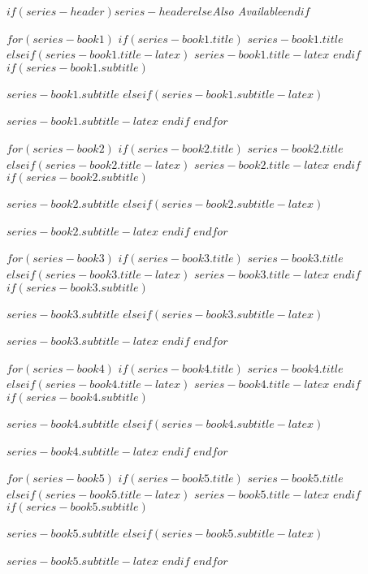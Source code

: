 \pagestyle{empty}

\begin{center}

\textit{$if(series-header)$$series-header$$else$Also Available$endif$}

\vspace{1cm}

$for(series-book1)$
$if(series-book1.title)$
\textbf{\textsc{$series-book1.title$}}
$elseif(series-book1.title-latex)$
\textbf{\textsc{$series-book1.title-latex$}}
$endif$
$if(series-book1.subtitle)$
\par $series-book1.subtitle$
$elseif(series-book1.subtitle-latex)$
\par $series-book1.subtitle-latex$
$endif$
$endfor$

\vspace{1cm}

$for(series-book2)$
$if(series-book2.title)$
\textbf{\textsc{$series-book2.title$}}
$elseif(series-book2.title-latex)$
\textbf{\textsc{$series-book2.title-latex$}}
$endif$
$if(series-book2.subtitle)$
\par $series-book2.subtitle$
$elseif(series-book2.subtitle-latex)$
\par $series-book2.subtitle-latex$
$endif$
$endfor$

$for(series-book3)$
$if(series-book3.title)$
\textbf{\textsc{$series-book3.title$}}
$elseif(series-book3.title-latex)$
\textbf{\textsc{$series-book3.title-latex$}}
$endif$
$if(series-book3.subtitle)$
\par $series-book3.subtitle$
$elseif(series-book3.subtitle-latex)$
\par $series-book3.subtitle-latex$
$endif$
$endfor$

$for(series-book4)$
$if(series-book4.title)$
\textbf{\textsc{$series-book4.title$}}
$elseif(series-book4.title-latex)$
\textbf{\textsc{$series-book4.title-latex$}}
$endif$
$if(series-book4.subtitle)$
\par $series-book4.subtitle$
$elseif(series-book4.subtitle-latex)$
\par $series-book4.subtitle-latex$
$endif$
$endfor$

$for(series-book5)$
$if(series-book5.title)$
\textbf{\textsc{$series-book5.title$}}
$elseif(series-book5.title-latex)$
\textbf{\textsc{$series-book5.title-latex$}}
$endif$
$if(series-book5.subtitle)$
\par $series-book5.subtitle$
$elseif(series-book5.subtitle-latex)$
\par $series-book5.subtitle-latex$
$endif$
$endfor$

\end{center}

